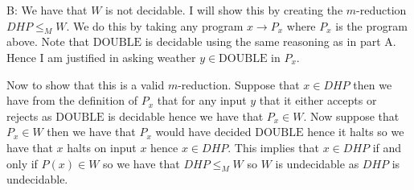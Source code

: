 \documentclass[11pt,twoside]{article}
\begin{document}
B: We have that $W$ is not decidable. I will show this by creating the $m$-reduction $DHP\leq_M W$. We do this by taking any program $x\to P_x$ where $P_x$ is the program above. Note that $\mathrm{DOUBLE}$ is decidable using the same reasoning as in part A. Hence I am justified in asking weather $y\in \mathrm{DOUBLE}$ in $P_x$.

Now to show that this is a valid $m$-reduction. Suppose that $x\in DHP$ then we have from the definition of $P_x$ that for any input $y$ that it either accepts or rejects as $\textrm{DOUBLE}$ is decidable hence we have that $P_x \in  W$. Now suppose that $P_x\in W$ then we have that $P_x$ would have decided $\mathrm{DOUBLE}$ hence it halts so we have that $x$ halts on input $x$ hence $x \in DHP$. This implies that $x\in DHP$ if and only if $P(x)\in W$ so we have that $DHP\leq_M W$ so $W$ is undecidable as $DHP$ is undecidable.
\end{document}
